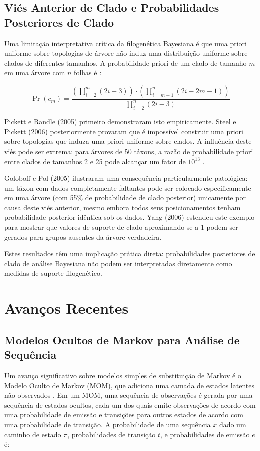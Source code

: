\subsection{Viés Anterior de Clado e Probabilidades Posteriores de Clado}

Uma limitação interpretativa crítica da filogenética Bayesiana é que uma priori uniforme sobre topologias de árvore não induz uma distribuição uniforme sobre clados de diferentes tamanhos. A probabilidade priori de um clado de tamanho $m$ em uma árvore com $n$ folhas é \parencite{wheeler2012}:

$$\Pr(c_m) = \frac{\left(\prod_{i=2}^{m} (2i-3)\right) \cdot \left(\prod_{i=m+1}^{n} (2i-2m-1)\right)}{\prod_{i=2}^{n} (2i-3)}$$

Pickett e Randle (2005) primeiro demonstraram isto empiricamente. Steel e Pickett (2006) posteriormente provaram que é impossível construir uma priori sobre topologias que induza uma priori uniforme sobre clados. A influência deste viés pode ser extrema: para árvores de 50 táxons, a razão de probabilidade priori entre clados de tamanhos 2 e 25 pode alcançar um fator de $10^{13}$ \parencite{wheeler2012}.

Goloboff e Pol (2005) ilustraram uma consequência particularmente patológica: um táxon com dados completamente faltantes pode ser colocado especificamente em uma árvore (com 55\% de probabilidade de clado posterior) unicamente por causa deste viés anterior, mesmo embora todos seus posicionamentos tenham probabilidade posterior idêntica sob os dados. Yang (2006) estendeu este exemplo para mostrar que valores de suporte de clado aproximando-se a 1 podem ser gerados para grupos ausentes da árvore verdadeira.

Estes resultados têm uma implicação prática direta: probabilidades posteriores de clado de análise Bayesiana não podem ser interpretadas diretamente como medidas de suporte filogenético.

\section{Avanços Recentes}

\subsection{Modelos Ocultos de Markov para Análise de Sequência}

Um avanço significativo sobre modelos simples de substituição de Markov é o Modelo Oculto de Markov (MOM), que adiciona uma camada de estados latentes não-observados \parencite{wheeler2012}. Em um MOM, uma sequência de observações é gerada por uma sequência de estados ocultos, cada um dos quais emite observações de acordo com uma probabilidade de emissão e transições para outros estados de acordo com uma probabilidade de transição. A probabilidade de uma sequência $x$ dado um caminho de estado $\pi$, probabilidades de transição $t$, e probabilidades de emissão $e$ é:

